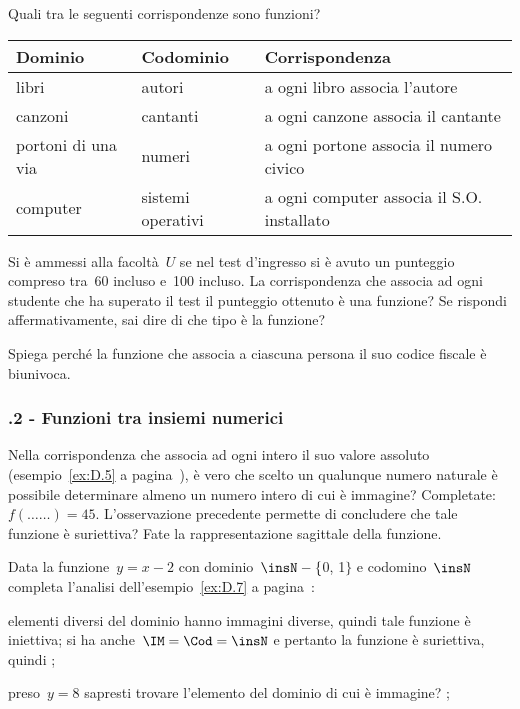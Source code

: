 \begin{esercizio}
 \label{ese:D.4}
Quali tra le seguenti corrispondenze sono funzioni?
\begin{center}
 \begin{tabular}{*3{l}}
 \toprule
  Dominio & Codominio & Corrispondenza\\
\midrule
libri & autori & a ogni libro associa l'autore\\
canzoni & cantanti & a ogni canzone associa il cantante\\
portoni di una via & numeri & a ogni portone associa il numero civico\\
computer & sistemi operativi & a ogni computer associa il S.O. installato\\
\bottomrule
 \end{tabular}
\end{center}
\end{esercizio}

\begin{esercizio}
 \label{ese:D.5}
Si è ammessi alla facoltà~$U$ se nel test
d'ingresso si è avuto un punteggio compreso tra~60
incluso e~100 incluso. La corrispondenza che associa ad ogni studente
che ha superato il test il punteggio ottenuto è una funzione? Se rispondi
affermativamente, sai dire di che tipo è la funzione?
\end{esercizio}


\begin{esercizio}
 \label{ese:D.6}
Spiega perché la funzione che associa a ciascuna
persona il suo codice fiscale è biunivoca.
\end{esercizio}

\subsubsection*{\thechapter.2 - Funzioni tra insiemi numerici}
\begin{esercizio}
 \label{ese:D.7}
Nella corrispondenza che associa ad ogni intero il suo valore assoluto (esempio~\ref{ex:D.5} a pagina~\pageref{ex:D.5}), è vero che scelto un qualunque numero naturale è
possibile determinare almeno un numero intero di cui è immagine?
Completate:~$f(\ldots\ldots) = 45.$
L'osservazione precedente permette di concludere che
tale funzione è suriettiva?
Fate la rappresentazione sagittale della funzione.
\end{esercizio}

\pagebreak

\begin{esercizio}
 \label{ese:D.8}
Data la funzione~$y=x-2$ con dominio~$\insN-\{$0, 1$\}$ e codomino~$\insN$ completa l'analisi dell'esempio~\ref{ex:D.7} a pagina~\pageref{ex:D.7}:
\begin{enumeratea}
\item elementi diversi del dominio hanno immagini diverse, quindi tale funzione è iniettiva;
si ha anche~$\IM =\Cod= \insN$ e pertanto la funzione è suriettiva, quindi \dotfill;
\item preso~$y = 8$ sapresti trovare l'elemento del dominio di cui è immagine? \dotfill;
\end{enumeratea}
\end{esercizio}

